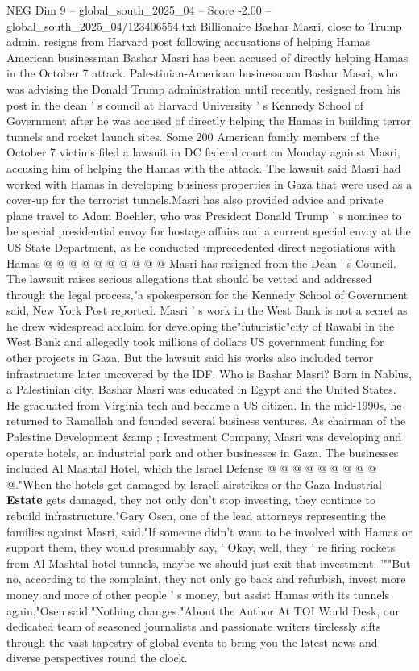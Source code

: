 \begin{textsample}{NEG Dim 9 – global\_south\_2025\_04 – Score -2.00 – global\_south\_2025\_04/123406554.txt}  \label{ex:f9_neg_270}
Billionaire Bashar Masri, close to Trump admin, resigns from Harvard post following accusations of helping Hamas American businessman Bashar Masri has been accused of directly helping Hamas in the October 7 attack.
Palestinian-American businessman Bashar Masri, who was advising the Donald Trump administration until recently, resigned from his post in the dean ' s council at Harvard University ' s Kennedy School of Government after he was accused of directly helping the Hamas in building terror tunnels and rocket launch sites.
Some 200 American family members of the October 7 victims filed a lawsuit in DC federal court on Monday against Masri, accusing him of helping the Hamas with the attack.
The lawsuit said Masri had worked with Hamas in developing business properties in Gaza that were used as a cover-up for the terrorist tunnels.Masri has also provided advice and private plane travel to Adam Boehler, who was President Donald Trump ' s nominee to be special presidential envoy for hostage affairs and a current special envoy at the US State Department, as he conducted unprecedented direct negotiations with Hamas @ @ @ @ @ @ @ @ @ @ Masri has resigned from the Dean ' s Council.
The lawsuit raises serious allegations that should be vetted and addressed through the legal process,"a spokesperson for the Kennedy School of Government said, New York Post reported.
Masri ' s work in the West Bank is not a secret as he drew widespread acclaim for developing the"futuristic"city of Rawabi in the West Bank and allegedly took millions of dollars US government funding for other projects in Gaza.
But the lawsuit said his works also included terror infrastructure later uncovered by the IDF.
Who is Bashar Masri?
Born in Nablus, a Palestinian city, Bashar Masri was educated in Egypt and the United States.
He graduated from Virginia tech and became a US citizen.
In the mid-1990s, he returned to Ramallah and founded several business ventures.
As chairman of the Palestine Development \&amp ; Investment Company, Masri was developing and operate hotels, an industrial park and other businesses in Gaza.
The businesses included Al Mashtal Hotel, which the Israel Defense @ @ @ @ @ @ @ @ @ @."When the hotels get damaged by Israeli airstrikes or the Gaza Industrial \textbf{Estate} gets damaged, they not only don't stop investing, they continue to rebuild infrastructure,"Gary Osen, one of the lead attorneys representing the families against Masri, said."If someone didn't want to be involved with Hamas or support them, they would presumably say, ' Okay, well, they ' re firing rockets from Al Mashtal hotel tunnels, maybe we should just exit that investment. '""But no, according to the complaint, they not only go back and refurbish, invest more money and more of other people ' s money, but assist Hamas with its tunnels again,"Osen said."Nothing changes."About the Author At TOI World Desk, our dedicated team of seasoned journalists and passionate writers tirelessly sifts through the vast tapestry of global events to bring you the latest news and diverse perspectives round the clock.

\end{textsample}
